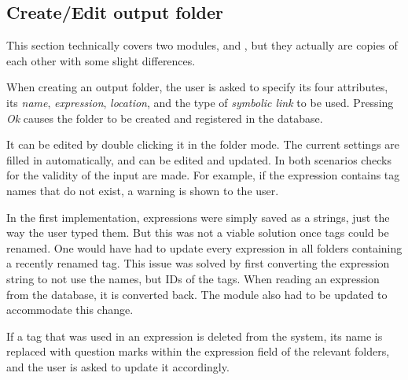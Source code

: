 \subsection{Create/Edit output folder}
\def\kapitelautor{Erik Ritschl}

This section technically covers two modules,  and , but they actually are copies of each other with some slight differences. 

When creating an output folder, the user is asked to specify its four attributes, its \emph{name}, \emph{expression}, \emph{location}, and the type of \emph{symbolic link} to be used. Pressing \emph{Ok} causes the folder to be created and registered in the database.

It can be edited by double clicking it in the folder mode. The current settings are filled in automatically, and can be edited and updated. In both scenarios checks for the validity of the input are made. For example, if the expression contains tag names that do not exist, a warning is shown to the user. 

In the first implementation, expressions were simply saved as a strings, just the way the user typed them. But this was not a viable solution once tags could be renamed. One would have had to update every expression in all folders containing a recently renamed tag. This issue was solved by first converting the expression string to not use the names, but IDs of the tags. When reading an expression from the database, it is converted back. The  module also had to be updated to accommodate this change. 

If a tag that was used in an expression is deleted from the system, its name is replaced with question marks within the expression field of the relevant folders, and the user is asked to update it accordingly.